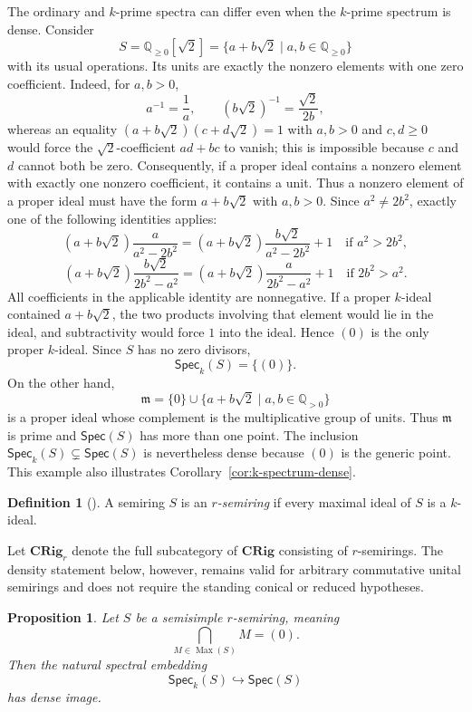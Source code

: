 \documentclass[12pt,leqno]{amsart}
\newcommand{\CRig}{\mathbf{CRig}}
\newcommand{\CRigr}{\mathbf{CRig}_{r}}
\newcommand{\Spec}{\mathsf{Spec}}
\newcommand{\Speck}{\mathsf{Spec}_{k}}
\newcommand{\Max}{\operatorname{Max}}
\newtheorem{proposition}[theorem]{Proposition}
\theoremstyle{definition}
\newtheorem{definition}{Definition}[section]
\numberwithin{equation}{section}
\theoremstyle{remark}
\begin{document}
The ordinary and $k$-prime spectra can differ even when the $k$-prime spectrum is dense. Consider
\[
S=\mathds{Q}_{\geq0}[\sqrt{2}]
 =\{a+b\sqrt{2}\mid a,b\in\mathds{Q}_{\geq0}\}
\]
with its usual operations. Its units are exactly the nonzero elements with one zero coefficient. Indeed, for $a,b>0$,
\[
a^{-1}=\frac1a,
\qquad
(b\sqrt{2})^{-1}=\frac{\sqrt{2}}{2b},
\]
whereas an equality
\((a+b\sqrt{2})(c+d\sqrt{2})=1\) with $a,b>0$ and $c,d\geq0$ would force the \(\sqrt{2}\)-coefficient
\(ad+bc\) to vanish; this is impossible because $c$ and $d$ cannot both be zero. Consequently, if a proper ideal contains a nonzero element with exactly one nonzero coefficient, it contains a unit. Thus a nonzero element of a proper ideal must have the form \(a+b\sqrt{2}\) with \(a,b>0\). Since \(a^2\neq2b^2\), exactly one of the following identities applies:
\[
(a+b\sqrt{2})\frac{a}{a^2-2b^2}
 =(a+b\sqrt{2})\frac{b\sqrt{2}}{a^2-2b^2}+1
 \quad\text{if }a^2>2b^2,
\]
\[
(a+b\sqrt{2})\frac{b\sqrt{2}}{2b^2-a^2}
 =(a+b\sqrt{2})\frac{a}{2b^2-a^2}+1
 \quad\text{if }2b^2>a^2.
\]
All coefficients in the applicable identity are nonnegative. If a proper $k$-ideal contained \(a+b\sqrt{2}\), the two products involving that element would lie in the ideal, and subtractivity would force $1$ into the ideal. Hence $(0)$ is the only proper $k$-ideal. Since $S$ has no zero divisors,
\[
\Speck(S)=\{(0)\}.
\]
On the other hand,
\[
\mathfrak m=\{0\}\cup
\{a+b\sqrt{2}\mid a,b\in\mathds{Q}_{>0}\}
\]
is a proper ideal whose complement is the multiplicative group of units. Thus \(\mathfrak m\) is prime and \(\Spec(S)\) has more than one point. The inclusion \(\Speck(S)\subsetneq\Spec(S)\) is nevertheless dense because $(0)$ is the generic point. This example also illustrates Corollary~\ref{cor:k-spectrum-dense}.

\begin{definition}[{\cite[Definition~3.3]{Chermnykh12}}]\label{def:r-semiring}
A semiring $S$ is an \emph{$r$-semiring} if every maximal ideal of $S$ is a $k$-ideal.
\end{definition}

Let \(\CRigr\) denote the full subcategory of \(\CRig\) consisting of $r$-semirings. The density statement below, however, remains valid for arbitrary commutative unital semirings and does not require the standing conical or reduced hypotheses.

\begin{proposition}\label{prop:r-semiring-density}
Let $S$ be a semisimple $r$-semiring, meaning
\[
\bigcap_{M\in\Max(S)}M=(0).
\]
Then the natural spectral embedding
\[
\Speck(S)\hookrightarrow\Spec(S)
\]
has dense image.
\end{proposition}
\end{document}
